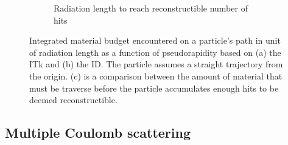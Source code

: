 \begin{figure}[h!]
\begin{subfigure}[b]{\textwidth}
    \caption{Radiation length to reach reconstructible number of hits~\cite{Aad_2025}}
    \label{subfig:rad-len-to-reco}
\end{subfigure}
    \caption{Integrated material budget encountered on a particle's path in unit of radiation length as a function of pseudorapidity based on (a) the ITk and (b) the ID. The particle assumes a straight trajectory from the origin. (c) is a comparison between the amount of material that must be traverse before the particle accumulates enough hits to be deemed reconstructible.}
    \label{fig:rad-len}
\end{figure}

\subsection{Multiple Coulomb scattering}\label{subsect:multi-scat}

